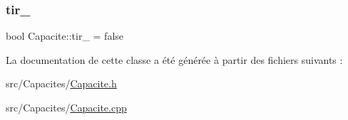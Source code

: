\mbox{\label{class_capacite_ae5318fb64d0def1069a9730c497d4bb6}} 
\subsubsection{\texorpdfstring{tir\+\_\+}{tir\_}}
{\footnotesize\ttfamily bool Capacite\+::tir\+\_\+ = false\hspace{0.3cm}{\ttfamily [protected]}}



La documentation de cette classe a été générée à partir des fichiers suivants \+:\begin{DoxyCompactItemize}
\item 
src/\+Capacites/\hyperlink{_capacite_8h}{Capacite.\+h}\item 
src/\+Capacites/\hyperlink{_capacite_8cpp}{Capacite.\+cpp}\end{DoxyCompactItemize}
